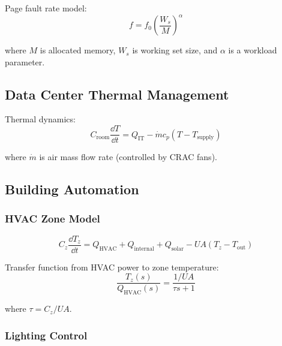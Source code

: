 Page fault rate model:
\begin{equation}
f = f_0 \left(\frac{W_s}{M}\right)^\alpha
\end{equation}

where $M$ is allocated memory, $W_s$ is working set size, and $\alpha$ is a workload parameter.

\subsection{Data Center Thermal Management}
\label{subsec:datacenter}



Thermal dynamics:
\begin{equation}
C_{\text{room}}\frac{\dd T}{\dd t} = Q_{\text{IT}} - \dot{m}c_p(T - T_{\text{supply}})
\end{equation}

where $\dot{m}$ is air mass flow rate (controlled by CRAC fans).

\subsection{Building Automation}
\label{subsec:building}

\subsubsection{HVAC Zone Model}

\begin{equation}
C_z\frac{\dd T_z}{\dd t} = Q_{\text{HVAC}} + Q_{\text{internal}} + Q_{\text{solar}} - UA(T_z - T_{\text{out}})
\end{equation}

Transfer function from HVAC power to zone temperature:
\begin{equation}
\frac{T_z(s)}{Q_{\text{HVAC}}(s)} = \frac{1/UA}{\tau s + 1}
\end{equation}

where $\tau = C_z/UA$.

\subsubsection{Lighting Control}

